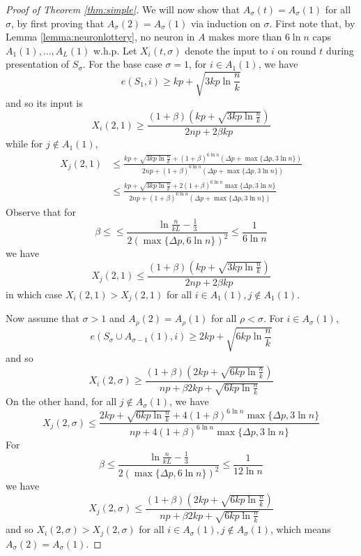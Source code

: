 \documentclass[12pt,nosubfloats]{alt2024} %
\newcommand{\1}{\mathbbm{1}}
\begin{document}
\begin{proof}[Proof of Theorem \ref{thm:simple}]
We will now show that $A_\sigma(t) = A_\sigma(1)$ for all $\sigma$, by first proving that $A_\sigma(2) = A_\sigma(1)$ via induction on $\sigma$. First note that, by Lemma \ref{lemma:neuronlottery}, no neuron in $A$ makes more than $6 \ln n$ caps $A_1(1), \ldots, A_L(1)$ w.h.p. Let $X_i(t, \sigma)$ denote the input to $i$ on round $t$ during presentation of $S_\sigma$. For the base case $\sigma = 1$, for $i \in A_{1}(1)$, we have
\[e(S_1, i) \ge kp + \sqrt{3kp \ln \frac{n}{k}}\]
and so its input is
\[X_i(2, 1) \ge \frac{(1 + \beta)(kp + \sqrt{3kp \ln \frac{n}{k}})}{2np + 2\beta kp}\]
while for $j \not\in A_1(1)$,
\begin{align*}
    X_j(2, 1) &\le \frac{kp + \sqrt{3kp\ln \frac{n}{k}} + (1 + \beta)^{6\ln n}(\Delta p + \max \{\Delta p, 3 \ln n\})}{2np + (1 + \beta)^{6\ln n}(\Delta p + \max \{\Delta p, 3 \ln n\})}\\
    &\le \frac{kp + \sqrt{3kp\ln \frac{n}{k}} + 2(1 + \beta)^{6\ln n}\max \{\Delta p, 3 \ln n\}}{2np + (1 + \beta)^{6\ln n}(\Delta p + \max \{\Delta p, 3 \ln n\})}
\end{align*}
Observe that for
\[\beta \le \le \frac{ \ln \frac{n}{kL} - \frac{1}{3}}{2 (\max \{\Delta p, 6 \ln n\})^2 } \le \frac{1}{6\ln n}\]
we have
\[X_j(2, 1) \le \frac{(1 + \beta)(kp + \sqrt{3kp \ln \frac{n}{k}})}{2np + 2\beta kp}\]
in which case $X_i(2, 1) > X_j(2, 1)$ for all $i \in A_1(1), j \not\in A_1(1)$.

Now assume that $\sigma > 1$ and $A_{\rho}(2) = A_{\rho}(1)$ for all $\rho < \sigma$. For $i \in A_\sigma(1)$, 
\[e(S_\sigma \cup A_{\sigma-1}(1), i) \ge 2kp + \sqrt{6kp \ln \frac{n}{k}}\]
and so
\[X_i(2, \sigma) \ge \frac{(1 + \beta) (2kp + \sqrt{6kp \ln \frac{n}{k}})}{np + \beta 2kp + \sqrt{6kp \ln \frac{n}{k}}}\]
 On the other hand, for all $j \not\in A_\sigma(1)$, we have
\[X_j(2, \sigma) \le \frac{2kp + \sqrt{6kp \ln \frac{n}{k}} + 4(1 + \beta)^{6 \ln n}\max \{\Delta p, 3 \ln n\}}{np + 4(1 + \beta)^{6 \ln n}\max \{\Delta p, 3 \ln n\}}\]
For 
\[\beta \le \frac{ \ln \frac{n}{kL} - \frac{1}{3}}{2 (\max \{\Delta p, 6 \ln n\})^2 } \le \frac{1}{12 \ln n} \] 
we have
\[X_j(2, \sigma) \le \frac{(1 + \beta) (2kp + \sqrt{6kp \ln \frac{n}{k}})}{np + \beta 2kp + \sqrt{6kp \ln \frac{n}{k}}}\]
and so $X_i(2, \sigma) > X_j(2, \sigma)$ for all $i \in A_\sigma(1), j \not\in A_\sigma(1)$, which means $A_\sigma(2) = A_\sigma(1)$.


\end{proof}
\end{document}
